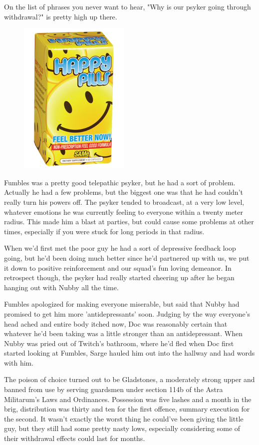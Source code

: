 On the list of phrases you never want to hear, "Why is our psyker going through withdrawal?" is pretty high up there.

\begin{figure}
	\begin{center}
		\includegraphics[width=\figwidth]{pics/10/34.png}
	\end{center}
\end{figure}
Fumbles was a pretty good telepathic psyker, but he had a sort of problem. 
Actually he had a few problems, but the biggest one was that he had couldn't really turn his powers off. 
The psyker tended to broadcast, at a very low level, whatever emotions he was currently feeling to everyone within a twenty meter radius. 
This made him a blast at parties, but could cause some problems at other times, especially if you were stuck for long periods in that radius. 


When we'd first met the poor guy he had a sort of depressive feedback loop going, but he'd been doing much better since he'd partnered up with us, we put it down to positive reinforcement and our squad's fun loving demeanor. 
In retrospect though, the psyker had really started cheering up after he began hanging out with Nubby all the time.

Fumbles apologized for making everyone miserable, but said that Nubby had promised to get him more 'antidepressants' soon. 
Judging by the way everyone's head ached and entire body itched now, Doc was reasonably certain that whatever he'd been taking was a little stronger than an antidepressant. 
When Nubby was pried out of Twitch's bathroom, where he'd fled when Doc first started looking at Fumbles, Sarge hauled him out into the hallway and had words with him. 


The poison of choice turned out to be Gladstones, a moderately strong upper and banned from use by serving guardsmen under section 114b of the Astra Militarum's Laws and Ordinances. 
Possession was five lashes and a month in the brig, distribution was thirty and ten for the first offence, summary execution for the second. 
It wasn't exactly the worst thing he could've been giving the little guy, but they still had some pretty nasty lows, especially considering some of their withdrawal effects could last for months. 


